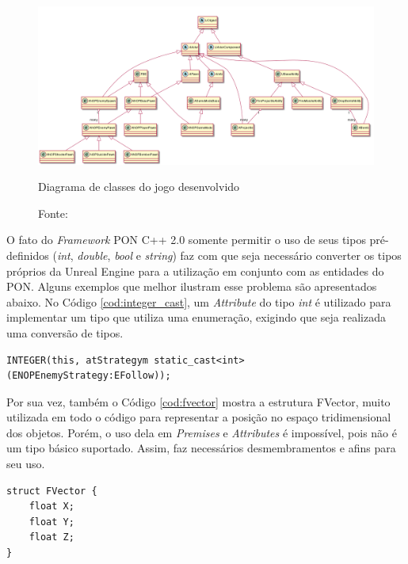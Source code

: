 \begin{figure}[!htb]
  \centering
  \includegraphics[width=\textwidth]{../out/diagrams/class_diagram_nop/NOPUnreal.png}
  \smallskip
  \caption{Diagrama de classes do jogo desenvolvido}
  \caption*{Fonte: }
  \label{fig:class_jogo_fw2}
\end{figure}

O fato do \textit{Framework} PON C++ 2.0 somente permitir o uso de seus tipos
pré-definidos (\textit{int}, \textit{double}, \textit{bool} e \textit{string})
faz com que seja necessário converter os tipos próprios da Unreal Engine para a
utilização em conjunto com as entidades do PON. Alguns exemplos que melhor
ilustram esse problema são apresentados abaixo. No Código
\ref{cod:integer_cast}, um \textit{Attribute} do tipo \textit{int} é utilizado
para implementar um tipo que utiliza uma enumeração, exigindo que seja realizada
uma conversão de tipos.

\begin{lstlisting}[caption = {Uso de \textit{static\_cast} para converter enumerações}, float=htb,
source = {Autoria própria},
label = {cod:integer_cast}]
INTEGER(this, atStrategym static_cast<int>(ENOPEnemyStrategy:EFollow));
\end{lstlisting}

Por sua vez, também o Código \ref{cod:fvector} mostra a estrutura FVector, muito
utilizada em todo o código para representar a posição no espaço tridimensional
dos objetos. Porém, o uso dela em \textit{Premises} e \textit{Attributes} é
impossível, pois não é um tipo básico suportado. Assim, faz necessários
desmembramentos e afins para seu uso. 

\begin{lstlisting}[caption = {Estrutura \textit{FVector} da Unreal Engine}, float=htb,
source = {Autoria própria},
label = {cod:fvector}]
struct FVector {
    float X;
    float Y;
    float Z;
}
\end{lstlisting}

